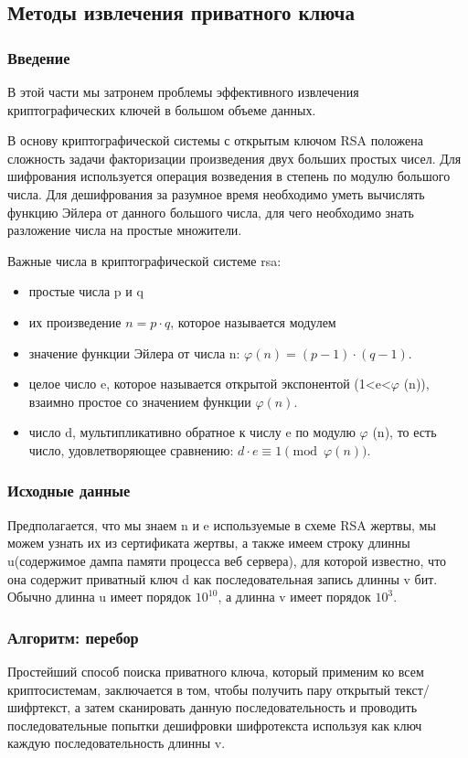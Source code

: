 \documentclass[20pt]{article}
\begin{document}
\subsection{Методы извлечения приватного ключа \cite{playing-hide-and-seek-with-stored-keys} }
\subsubsection{Введение}
В этой части мы затронем проблемы эффективного извлечения криптографических
ключей в большом объеме данных.

В основу криптографической системы с открытым ключом RSA положена сложность задачи
факторизации произведения двух больших простых чисел. Для шифрования используется
операция возведения в степень по модулю большого числа. Для дешифрования за
разумное время необходимо уметь вычислять функцию Эйлера от данного большого
числа, для чего необходимо знать разложение числа на простые множители.

Важные числа в криптографической системе rsa:
\begin{itemize}
  \item простые числа p и q
  \item их произведение $n=p \cdot q$, которое называется модулем
  \item значение функции Эйлера от числа n: $\varphi (n)=(p-1)\cdot (q-1)$.
  \item целое число e, которое называется открытой экспонентой
    (1<e<$\varphi$ (n)), взаимно простое со значением функции $\varphi(n)$.
  \item число d, мультипликативно обратное к числу e по модулю
    $\varphi$ (n), то есть число, удовлетворяющее сравнению: $d\cdot e\equiv 1{\pmod {\varphi (n)}}$.
\end{itemize}

\subsubsection{Исходные данные}
Предполагается, что мы знаем n и e используемые в схеме RSA жертвы, мы можем
узнать их из сертификата жертвы, а также имеем строку длинны u(содержимое дампа
памяти процесса веб сервера), для которой известно, что она содержит приватный
ключ d как последовательная запись длинны v бит. Обычно длинна u имеет порядок
$10^10$, а длинна v имеет порядок $10^3$.

\subsubsection{Алгоритм: перебор}
Простейший способ поиска приватного ключа, который применим ко всем
криптосистемам, заключается в том, чтобы получить пару открытый текст/шифртекст,
а затем сканировать данную последовательность и проводить последовательные попытки
дешифровки шифротекста используя как ключ каждую последовательность длинны v.
\end{document}
